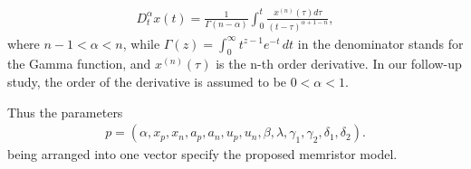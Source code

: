 \documentclass[10pt]{article}
\begin{document}
\begin{multicols}{2}
\begin{align}
    D_t^\alpha x(t) = \frac{1}{\Gamma (n-\alpha)} \int_0^t \frac{x^{(n)} (\tau)d \tau}{(t - \tau)^{\alpha+1-n}}, \label{equa:12}
\end{align}
where $n-1<\alpha<n$, while $\Gamma (z)= \int_0^\infty t^{z-1} e^{-t} \,dt$ in the denominator stands for the Gamma function, and $x^{(n)} (\tau)$ is the n-th order derivative. In our follow-up study, the order of the derivative is assumed to be $0 < \alpha < 1$. \par
Thus the parameters
\begin{align}
    p = (\alpha, x_p, x_n, a_p, a_n, u_p, u_n, \beta, \lambda, \gamma _1, \gamma _2, \delta_1, \delta_2). \label{equa:13}
\end{align}
being arranged into one vector specify the proposed memristor model.
\par


{\centering %
}
\end{multicols}
\end{document}

